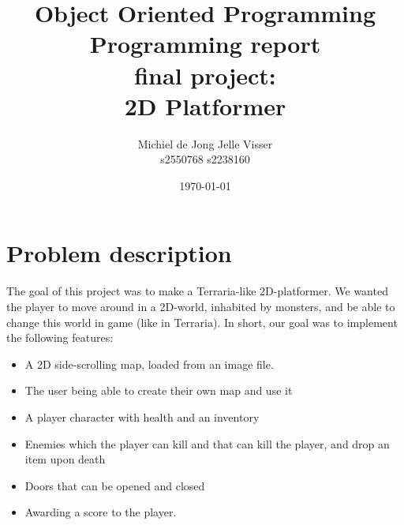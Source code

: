 \documentclass[a4paper,10pt,twoside]{article}
\begin{document}


\title{Object Oriented Programming\\
Programming report \\
final project:\\
2D Platformer
}

\date{\today}

\author{Michiel de Jong \quad Jelle Visser\\
s2550768 \quad s2238160 \\
}

\maketitle

\section{Problem description}
The goal of this project was to make a Terraria-like 2D-platformer. We wanted the player to move around in a 2D-world, inhabited by monsters, and be able to change this world in game (like in Terraria). In short, our goal was to implement the following features:
\begin{itemize}
\item A 2D side-scrolling map, loaded from an image file.
\item The user being able to create their own map and use it
\item A player character with health and an inventory
\item Enemies which the player can kill and that can kill the player, and drop an item upon death
\item Doors that can be opened and closed
\item Awarding a score to the player.
\end{itemize}
\end{document}

